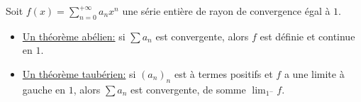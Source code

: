 Soit $f(x) = \sum\limits_{n=0}^{+\infty} a_n x^n$ une série entière de rayon de convergence égal à $1$.
\begin{itemize}
    \item \underline{Un théorème abélien:} si $\sum a_n$ est convergente, alors $f$ est définie et continue en $1$.
    \item \underline{Un théorème taubérien:} si $(a_n)_n$ est à termes positifs et $f$ a une limite à gauche en $1$, alors $\sum a_n$ est convergente, de somme $\displaystyle \lim_{1^-}f$.
\end{itemize}